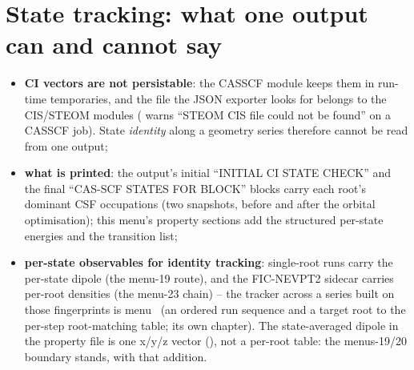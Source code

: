\section{State tracking: what one output can and cannot say}

\begin{readbox}
\begin{itemize}
  \item \textbf{CI vectors are not persistable}: the CASSCF module keeps them
    in run-time temporaries, and the  file the JSON exporter looks
    for belongs to the CIS/STEOM modules ( warns ``STEOM
    CIS file could not be found'' on a CASSCF job).  State \emph{identity}
    along a geometry series therefore cannot be read from one output;
  \item \textbf{what is printed}: the output's initial ``INITIAL CI STATE
    CHECK'' and the final ``CAS-SCF STATES FOR BLOCK'' blocks carry each
    root's dominant CSF occupations (two snapshots, before and after the
    orbital optimisation); this menu's property sections add the structured
    per-state energies and the transition list;
  \item \textbf{per-state observables for identity tracking}: single-root runs
    carry the per-state dipole (the menu-19 route), and the FIC-NEVPT2 sidecar
    carries per-root densities (the menu-23 chain) -- the tracker across a
    series built on those fingerprints is menu~ (an ordered run
    sequence and a target root to the per-step root-matching table; its own
    chapter).  The state-averaged dipole in the property
    file is one x/y/z vector (), not a per-root table: the
    menus-19/20 boundary stands, with that addition.
\end{itemize}
\end{readbox}
